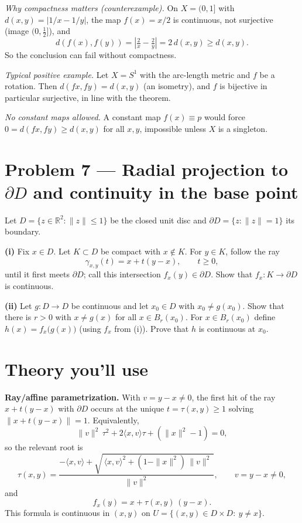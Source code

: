 \documentclass[12pt,a4paper]{article}
\theoremstyle{plain}
\theoremstyle{definition}
\theoremstyle{remark}
\theoremstyle{remark}
\begin{document}
\noindent\emph{Why compactness matters (counterexample).}
On \(X=(0,1]\) with \(d(x,y)=\bigl|1/x-1/y\bigr|\), the map \(f(x)=x/2\) is continuous,
not surjective (image \((0,\tfrac12]\)), and
\[
d(f(x),f(y))=\left|\tfrac{2}{x}-\tfrac{2}{y}\right|=2\,d(x,y)\ge d(x,y).
\]
So the conclusion can fail without compactness.

\smallskip

\noindent\emph{Typical positive example.}
Let \(X=S^1\) with the arc-length metric and \(f\) be a rotation.
Then \(d(fx,fy)=d(x,y)\) (an isometry), and \(f\) is bijective in particular surjective,
in line with the theorem.

\smallskip

\noindent\emph{No constant maps allowed.}
A constant map \(f(x)\equiv p\) would force \(0=d(fx,fy)\ge d(x,y)\) for all \(x,y\),
impossible unless \(X\) is a singleton.

\section*{Problem 7 — Radial projection to $\partial D$ and continuity in the base point}

Let $D=\{z\in\mathbb{R}^2:\|z\|\le 1\}$ be the closed unit disc and $\partial D=\{z:\|z\|=1\}$ its boundary.

\smallskip

\noindent\textbf{(i)} Fix $x\in D$. Let $K\subset D$ be compact with $x\notin K$.
For $y\in K$, follow the ray
\[
\gamma_{x,y}(t)=x+t(y-x),\qquad t\ge 0,
\]
until it first meets $\partial D$; call this intersection $f_x(y)\in \partial D$.
Show that $f_x:K\to\partial D$ is continuous.

\smallskip

\noindent\textbf{(ii)} Let $g:D\to D$ be continuous and let $x_0\in D$ with $x_0\ne g(x_0)$.
Show that there is $r>0$ with $x\ne g(x)$ for all $x\in B_r(x_0)$.
For $x\in B_r(x_0)$ define $h(x)=f_x\bigl(g(x)\bigr)$ (using $f_x$ from (i)).
Prove that $h$ is continuous at $x_0$.

\bigskip

\section*{Theory you’ll use}

\noindent\textbf{Ray/affine parametrization.}
With $v=y-x\ne 0$, the first hit of the ray $x+t(y-x)$ with $\partial D$ occurs at the unique
$t=\tau(x,y)\ge 1$ solving $\|x+t(y-x)\|=1$.
Equivalently,
\[
\|v\|^2\,\tau^2+2\langle x,v\rangle \tau + (\|x\|^2-1)=0,
\]
so the relevant root is
\[
\tau(x,y)=\frac{-\langle x,v\rangle+\sqrt{\,\langle x,v\rangle^2+(1-\|x\|^2)\,\|v\|^2\,}}{\|v\|^2},
\qquad v=y-x\ne 0,
\]
and
\[
f_x(y)=x+\tau(x,y)\,(y-x).
\]
This formula is continuous in $(x,y)$ on $U=\{(x,y)\in D\times D:\ y\ne x\}$.
\end{document}
